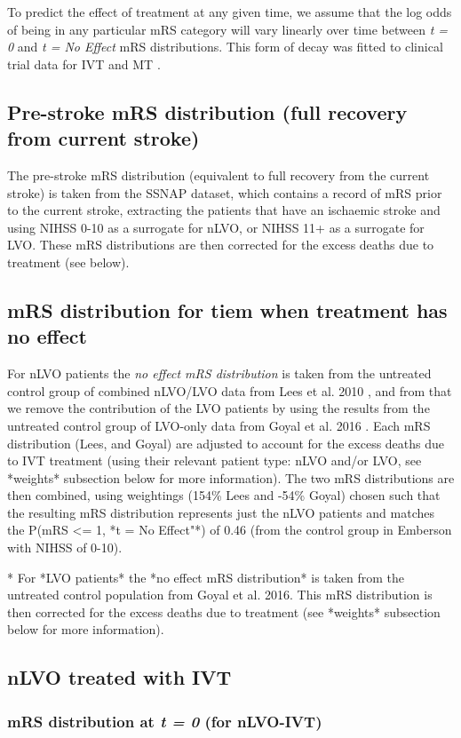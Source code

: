 To predict the effect of treatment at any given time, we assume that the log odds of being in any particular mRS category will vary linearly over time between \emph{t = 0} and \emph{t = No Effect} mRS distributions. This form of decay was fitted to clinical trial data for IVT \cite{emberson_effect_2014} and MT \cite{fransen_time_2016}.

\subsection{Pre-stroke mRS distribution (full recovery from current stroke)}

The pre-stroke mRS distribution (equivalent to full recovery from the current stroke) is taken from the SSNAP dataset, which contains a record of mRS prior to the current stroke, extracting the patients that have an ischaemic stroke and using NIHSS 0-10 as a surrogate for nLVO, or NIHSS 11+ as a surrogate for LVO. These mRS distributions are then corrected for the excess deaths due to treatment (see below).

\subsection{mRS distribution for tiem when treatment has no effect}

For nLVO patients the \emph{no effect mRS distribution} is taken from the untreated control group of combined nLVO/LVO data from Lees et al. 2010 \cite{lees_time_2010}, and from that we remove the contribution of the LVO patients by using the results from the untreated control group of LVO-only data from Goyal et al. 2016 . Each mRS distribution (Lees, and Goyal) are adjusted to account for the excess deaths due to IVT treatment (using their relevant patient type: nLVO and/or LVO, see *weights* subsection below for more information). The two mRS distributions are then combined, using weightings (154\% Lees and -54\% Goyal) chosen such that the resulting mRS distribution represents just the nLVO patients and matches the P(mRS <= 1, *t = No Effect"*) of 0.46 (from the control group in Emberson with NIHSS of 0-10).

* For *LVO patients* the *no effect mRS distribution* is taken from the untreated control population from Goyal et al. 2016.  This mRS distribution is then corrected for the excess deaths due to treatment (see *weights* subsection below for more information).



\subsection{nLVO treated with IVT}

\subsubsection{mRS distribution at \emph{t = 0} (for nLVO-IVT)}

